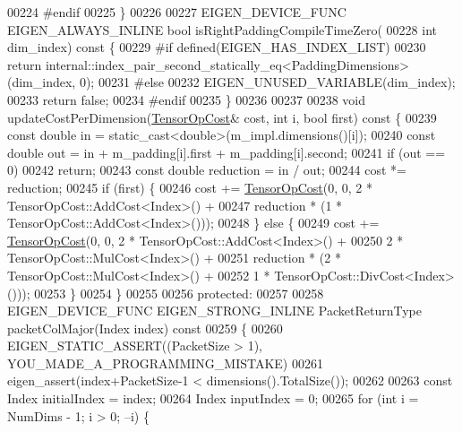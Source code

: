 \begin{DoxyCode}
00224 \textcolor{preprocessor}{#endif}
00225   \}
00226 
00227   EIGEN\_DEVICE\_FUNC EIGEN\_ALWAYS\_INLINE \textcolor{keywordtype}{bool} isRightPaddingCompileTimeZero(
00228       \textcolor{keywordtype}{int} dim\_index)\textcolor{keyword}{ const }\{
00229 \textcolor{preprocessor}{#if defined(EIGEN\_HAS\_INDEX\_LIST)}
00230     \textcolor{keywordflow}{return} internal::index\_pair\_second\_statically\_eq<PaddingDimensions>(dim\_index, 0);
00231 \textcolor{preprocessor}{#else}
00232     EIGEN\_UNUSED\_VARIABLE(dim\_index);
00233     \textcolor{keywordflow}{return} \textcolor{keyword}{false};
00234 \textcolor{preprocessor}{#endif}
00235   \}
00236 
00237 
00238   \textcolor{keywordtype}{void} updateCostPerDimension(\hyperlink{class_eigen_1_1_tensor_op_cost}{TensorOpCost}& cost, \textcolor{keywordtype}{int} i, \textcolor{keywordtype}{bool} first)\textcolor{keyword}{ const }\{
00239     \textcolor{keyword}{const} \textcolor{keywordtype}{double} in = \textcolor{keyword}{static\_cast<}\textcolor{keywordtype}{double}\textcolor{keyword}{>}(m\_impl.dimensions()[i]);
00240     \textcolor{keyword}{const} \textcolor{keywordtype}{double} out = in + m\_padding[i].first + m\_padding[i].second;
00241     \textcolor{keywordflow}{if} (out == 0)
00242       \textcolor{keywordflow}{return};
00243     \textcolor{keyword}{const} \textcolor{keywordtype}{double} reduction = in / out;
00244     cost *= reduction;
00245     \textcolor{keywordflow}{if} (first) \{
00246       cost += \hyperlink{class_eigen_1_1_tensor_op_cost}{TensorOpCost}(0, 0, 2 * TensorOpCost::AddCost<Index>() +
00247                     reduction * (1 * TensorOpCost::AddCost<Index>()));
00248     \} \textcolor{keywordflow}{else} \{
00249       cost += \hyperlink{class_eigen_1_1_tensor_op_cost}{TensorOpCost}(0, 0, 2 * TensorOpCost::AddCost<Index>() +
00250                                  2 * TensorOpCost::MulCost<Index>() +
00251                     reduction * (2 * TensorOpCost::MulCost<Index>() +
00252                                  1 * TensorOpCost::DivCost<Index>()));
00253     \}
00254   \}
00255 
00256  \textcolor{keyword}{protected}:
00257 
00258   EIGEN\_DEVICE\_FUNC EIGEN\_STRONG\_INLINE PacketReturnType packetColMajor(Index index)\textcolor{keyword}{ const}
00259 \textcolor{keyword}{  }\{
00260     EIGEN\_STATIC\_ASSERT((PacketSize > 1), YOU\_MADE\_A\_PROGRAMMING\_MISTAKE)
00261     eigen\_assert(index+PacketSize-1 < dimensions().TotalSize());
00262 
00263     \textcolor{keyword}{const} Index initialIndex = index;
00264     Index inputIndex = 0;
00265     \textcolor{keywordflow}{for} (\textcolor{keywordtype}{int} i = NumDims - 1; i > 0; --i) \{

\end{DoxyCode}
